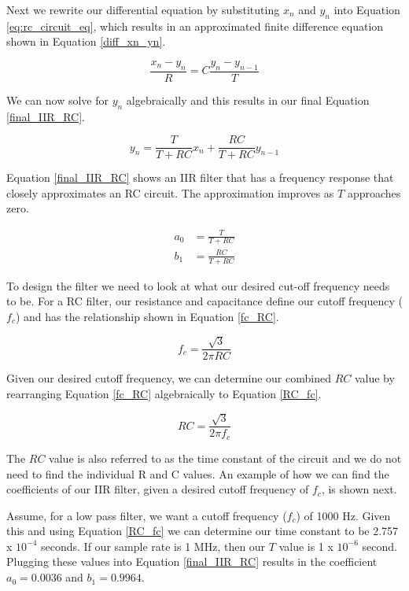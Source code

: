 Next we rewrite our differential equation by substituting $x_n$ and $y_n$ into Equation \ref{eq:rc_circuit_eq}, which results in an approximated finite difference equation shown in Equation \ref{diff_xn_yn}.

\begin{equation}\label{diff_xn_yn}
\frac{x_n-y_n}{R}=C\frac{y_n-y_{n-1}}{T}
\end{equation}

We can now solve for $y_n$ algebraically and this results in our final Equation \ref{final_IIR_RC}.

\begin{equation}\label{final_IIR_RC}
y_n=\frac{T}{T+RC}x_n+\frac{RC}{T+RC}y_{n-1}
\end{equation}

Equation \ref{final_IIR_RC} shows an IIR filter that has a frequency response that closely approximates an RC circuit.  The approximation improves as $T$ approaches zero.

\begin{align}
a_0 &= \frac{T}{T+RC} \\
b_1 &= \frac{RC}{T+RC}
\end{align}


To design the filter we need to look at what our desired cut-off frequency needs to be.  For a RC filter, our resistance and capacitance define our cutoff frequency ($f_c$) and has the relationship shown in Equation \ref{fc_RC}.

\begin{equation}\label{fc_RC}
f_c=\frac{\sqrt{3}}{2\pi RC}
\end{equation}

Given our desired cutoff frequency, we can determine our combined $RC$ value by rearranging Equation \ref{fc_RC} algebraically to Equation \ref{RC_fc}.

\begin{equation}\label{RC_fc}
RC=\frac{\sqrt{3}}{2\pi f_c}
\end{equation}

The $RC$ value is also referred to as the time constant of the circuit and we do not need to find the individual R and C values.  An example of how we can find the coefficients of our IIR filter, given a desired cutoff frequency of $f_c$, is shown next.  

Assume, for a low pass filter, we want a cutoff frequency ($f_c$) of 1000 Hz.  Given this and using Equation \ref{RC_fc} we can determine our time constant to be 2.757 x $10^{-4}$ seconds.  If our sample rate is 1 MHz, then our $T$ value is 1 x $10^{-6}$ second.  Plugging these values into Equation \ref{final_IIR_RC} results in the coefficient $a_0 = 0.0036$ and $b_1=0.9964$.

